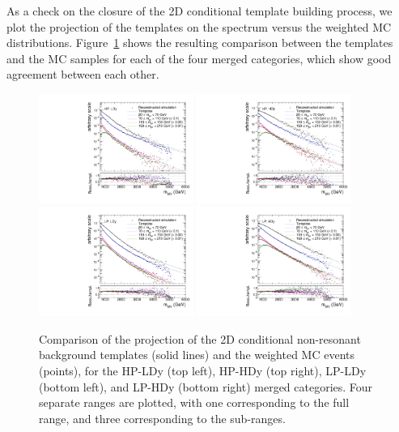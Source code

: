 As a check on the closure of the 2D conditional template building process, we plot the projection of the templates on the \MVV spectrum versus the weighted MC distributions.
Figure~\ref{fig:condTemplateVscondReco_nonRes_MVV_Run2} shows the resulting comparison between the templates and the MC samples for each of the four merged categories, which show good agreement between each other.

\begin{figure}[htbp]
  \centering
  \includegraphics[width=0.45\textwidth]{fig/2Dfit/templateVsReco_nonResCond_MVV_e_HP_nobb_LDy.pdf}
  \includegraphics[width=0.45\textwidth]{fig/2Dfit/templateVsReco_nonResCond_MVV_e_HP_nobb_HDy.pdf}\\
  \includegraphics[width=0.45\textwidth]{fig/2Dfit/templateVsReco_nonResCond_MVV_e_LP_nobb_LDy.pdf}
  \includegraphics[width=0.45\textwidth]{fig/2Dfit/templateVsReco_nonResCond_MVV_e_LP_nobb_HDy.pdf}\\
  \caption{
    Comparison of the \MVV projection of the 2D conditional non-resonant background templates (solid lines) and the weighted MC events (points), for the HP-LDy (top left), HP-HDy (top right), LP-LDy (bottom left), and LP-HDy (bottom right) merged categories.
    Four separate \MJ ranges are plotted, with one corresponding to the full \MJ range, and three corresponding to the sub-ranges.
  }
  \label{fig:condTemplateVscondReco_nonRes_MVV_Run2}
\end{figure}

